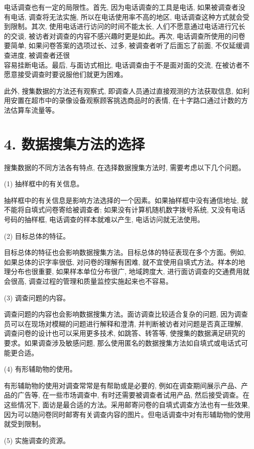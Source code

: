 \documentclass[10pt]{article}
\begin{document}
\begin{CJK*}{UTF8}{bsmi}
电话调查也有一定的局限性。首先, 因为电话调查的工具是电话, 如果被调查者没有电话, 调查将无法实施, 所以在电话使用率不高的地区, 电话调查这种方式就会受到限制。其次, 使用电话进行访问的时间不能太长, 人们不愿意通过电话进行冗长的交谈, 被访者对调查的内容不感兴趣时更是如此。再次, 电话调查所使用的问卷要简单, 如果问卷答案的选项过长、过多, 被调查者听了后面忘了前面, 不仅延缓调查进度, 被调查者还很\\
容易挂断电话。最后, 与面访式相比, 电话调查由于不是面对面的交流, 在被访者不愿意接受调查时要说服他们就更为困难。

此外, 搜集数据的方法还有观察式, 即调查人员通过直接观测的方法获取信息, 如利用安置在超市中的录像设备观察顾客挑选商品时的表情, 在十字路口通过计数的方法估算车流量等。

\section*{4. 数据搜集方法的选择}
搜集数据的不同方法各有特点, 在选择数据搜集方法时, 需要考虑以下几个问题。

(1) 抽样框中的有关信息。

抽样框中的有关信息是影响方法选择的一个因素。如果抽样框中没有通信地址, 就不能将自填式问卷寄给被调查者; 如果没有计算机随机数字拨号系统, 又没有电话号码的抽样框, 电话调查的样本就难以产生, 电话访问就无法使用。

(2) 目标总体的特征。

目标总体的特征也会影响数据搜集方法。目标总体的特征表现在多个方面。例如, 如果总体的识字率很低, 对问卷的理解有困难, 就不宜使用自填式方法。样本的地理分布也很重要, 如果样本单位分布很广, 地域跨度大, 进行面访调查的交通费用就会很高, 调查过程的管理和质量监控实施起来也不容易。

(3) 调查问题的内容。

调查问题的内容也会影响数据搜集方法。面访调查比较适合复杂的问题, 因为调查员可以在现场对模糊的问题进行解释和澄清, 并判断被访者对问题是否真正理解, 调查问卷的设计也可以采用更多技术, 如跳答、转答等, 使搜集的数据满足研究的要求。如果调查涉及敏感问题, 那么使用匿名的数据搜集方法如自填式或电话式可能更合适。

(4) 有形辅助物的使用。

有形辅助物的使用对调查常常是有帮助或是必要的, 例如在调查期间展示产品、产品的广告等, 在一些市场调查中, 有时还需要被调查者试用产品, 然后接受调查。在这些情况下, 面访是最合适的方法。采用邮寄问卷的自填式调查方法也有一些效果, 因为可以随问卷同时邮寄有关调查内容的图片。但电话调查中对有形辅助物的使用就受到限制。

(5) 实施调查的资源。


\end{CJK*}
\end{document}
